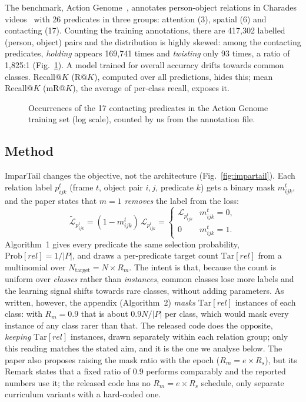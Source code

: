 \documentclass[conference,a4paper]{IEEEtran}
\begin{document}
The benchmark, Action Genome~\cite{ag}, annotates person-object relations in Charades
videos~\cite{charades} with 26 predicates in three groups: attention (3), spatial (6) and
contacting (17). Counting the training annotations, there are 417,302 labelled
(person, object) pairs and the distribution is highly skewed: among the contacting
predicates, \emph{holding} appears 169,741 times and \emph{twisting} only 93 times, a ratio
of 1,825:1 (Fig.~\ref{fig:tail}).
A model trained for overall accuracy drifts towards common classes. Recall@$K$ (R@$K$),
computed over all predictions, hides this; mean Recall@$K$ (mR@$K$), the average of
per-class recall, exposes it.

\begin{figure}[!t]
\centering
\resizebox{\columnwidth}{!}{}
\caption{Occurrences of the 17 contacting predicates in the Action Genome training set (log scale), counted by us from the annotation file.}
\label{fig:tail}
\end{figure}

\subsection{Method}
ImparTail changes the objective, not the architecture (Fig.~\ref{fig:impartail}). Each
relation label $p^t_{ijk}$ (frame $t$, object pair $i,j$, predicate $k$) gets a binary mask
$m^t_{ijk}$, and the paper states that $m=1$ \emph{removes} the label from the loss:
\begin{equation}
\tilde{\mathcal{L}}_{p^t_{ijk}}=(1-m^t_{ijk})\,\mathcal{L}_{p^t_{ijk}}=\begin{cases}\mathcal{L}_{p^t_{ijk}} & m^t_{ijk}=0,\\ 0 & m^t_{ijk}=1.\end{cases} \tag{5}
\end{equation}
Algorithm~1 gives every predicate the same selection probability,
$\mathrm{Prob}[rel]=1/|P|$, and draws a per-predicate target count $\mathrm{Tar}[rel]$ from
a multinomial over $N_{\mathrm{target}}=N\times R_m$. The intent is that, because the count
is uniform over \emph{classes} rather than \emph{instances}, common classes lose more
labels and the learning signal shifts towards rare classes, without adding parameters. As
written, however, the appendix (Algorithm~2) \emph{masks} $\mathrm{Tar}[rel]$ instances of
each class: with $R_m=0.9$ that is about $0.9N/|P|$ per class, which would mask every
instance of any class rarer than that. The released code does the opposite, \emph{keeping}
$\mathrm{Tar}[rel]$ instances, drawn separately within each relation group; only this
reading matches the stated aim, and it is the one we analyse below. The paper also proposes raising the mask ratio with
the epoch ($R_m=e\times R_s$), but its Remark states that a fixed ratio of 0.9 performs
comparably and the reported numbers use it; the released code has no $R_m=e\times R_s$
schedule, only separate curriculum variants with a hard-coded one.
\end{document}
